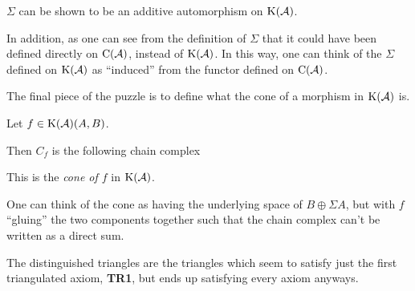 \( \Sigma \) can be shown to be an additive automorphism on \( \K(\Ac) \).

In addition, as one can see from the definition of \( \Sigma \) that it could have been defined directly on \( \operatorname{C}({\mathcal{A}}) \), instead of \( \K(\Ac) \). In this way, one can think of the \( \Sigma \) defined on \( \K(\Ac) \) as ``induced'' from the functor defined on \( \operatorname{C}({\mathcal{A}}) \).

The final piece of the puzzle is to define what the cone of a morphism in \( \K(\Ac) \) is.

\begin{definition}[Cone in \( \K(\Ac) \)]
    Let \( f \in \operatorname{K}({\mathcal{A}})(A, B) \).

    Then \( C_f \) is the following chain complex
    \begin{center}
    \end{center}

    This is the \emph{cone of \( f \)} in \( \K(\Ac) \).
\end{definition}

One can think of the cone as having the underlying space of \( B \oplus \Sigma A \), but with \( f \) ``gluing'' the two components together such that the chain complex can't be written as a direct sum.

The distinguished triangles are the triangles which seem to satisfy just the first triangulated axiom, {\bf TR1}, but ends up satisfying every axiom anyways.

